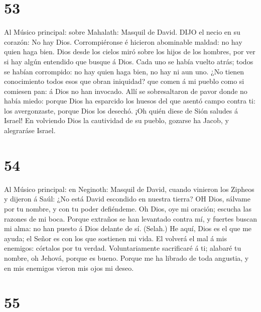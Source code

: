 \hypertarget{section-52}{%
\section{53}\label{section-52}}

 Al Músico principal: sobre Mahalath: Masquil de David. DIJO
el necio en su corazón: No hay Dios. Corrompiéronse é hicieron
abominable maldad: no hay quien haga bien.  Dios desde los
cielos miró sobre los hijos de los hombres, por ver si hay algún
entendido que busque á Dios.  Cada uno se había vuelto
atrás; todos se habían corrompido: no hay quien haga bien, no hay ni aun
uno.  ¿No tienen conocimiento todos esos que obran
iniquidad? que comen á mi pueblo como si comiesen pan: á Dios no han
invocado.  Allí se sobresaltaron de pavor donde no había
miedo: porque Dios ha esparcido los huesos del que asentó campo contra
ti: los avergonzaste, porque Dios los desechó.  ¡Oh quién
diese de Sión saludes á Israel! En volviendo Dios la cautividad de su
pueblo, gozarse ha Jacob, y alegraráse Israel.

\hypertarget{section-53}{%
\section{54}\label{section-53}}

 Al Músico principal: en Neginoth: Masquil de David, cuando
vinieron los Zipheos y dijeron á Saúl: ¿No está David escondido en
nuestra tierra? OH Dios, sálvame por tu nombre, y con tu poder
defiéndeme.  Oh Dios, oye mi oración; escucha las razones de
mi boca.  Porque extraños se han levantado contra mí, y
fuertes buscan mi alma: no han puesto á Dios delante de sí. (Selah.)
 He aquí, Dios es el que me ayuda; el Señor es con los que
sostienen mi vida.  El volverá el mal á mis enemigos:
córtalos por tu verdad.  Voluntariamente sacrificaré á ti;
alabaré tu nombre, oh Jehová, porque es bueno.  Porque me ha
librado de toda angustia, y en mis enemigos vieron mis ojos mi deseo.

\hypertarget{section-54}{%
\section{55}\label{section-54}}


